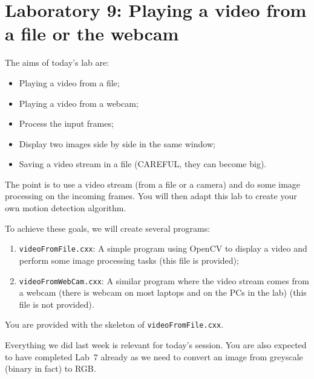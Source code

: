 \documentclass[english,a4paper,12pt,oneside]{article}
\begin{document}
\section*{Laboratory 9: Playing a video from a file or the webcam}


The aims of today's lab are:
\begin{itemize}
	\item Playing a video from a file;
	\item Playing a video from a webcam;
	\item Process the input frames;
	\item Display two images side by side in the same window;
	\item Saving a video stream in a file (CAREFUL, they can become big).
\end{itemize}
The point is to use a video stream (from a file or a camera) and do some image processing on the incoming frames. You will then adapt this lab to create your own motion detection algorithm. 

To achieve these goals, we will create several programs:
\begin{enumerate}
	\item \verb+videoFromFile.cxx+: A simple program using OpenCV to display a video and perform some image processing tasks (this file is provided);
	\item \verb+videoFromWebCam.cxx+: A similar program where the video stream comes from a webcam (there is webcam on most laptops and on the PCs in the lab) (this file is not provided).
\end{enumerate}
You are provided with the skeleton of \verb+videoFromFile.cxx+. 

Everything we did last week is relevant for today's session. 
You are also expected to have completed Lab~7 already as we need to convert an image from greyscale (binary in fact) to RGB. 
\end{document}

